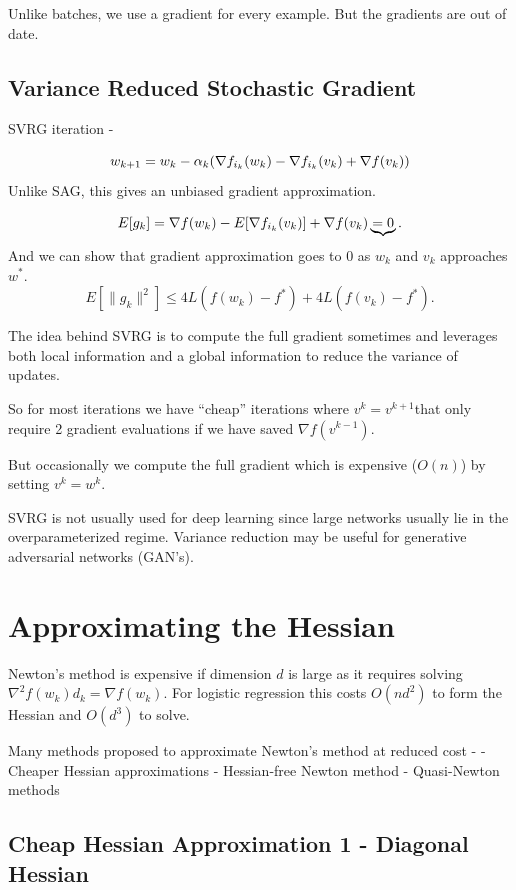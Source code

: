 \documentclass[
]{article}
\begin{document}
Unlike batches, we use a gradient for every example. But the gradients are out of date.

\subsection{Variance Reduced Stochastic Gradient}\label{variance-reduced-stochastic-gradient}

SVRG iteration -

\[
w_{k+1} = w_k - \alpha_k(\nabla f_{i_k}(w_k) - \nabla f_{i_k}(v_k) + \nabla f(v_k)) \\
\]
Unlike SAG, this gives an unbiased gradient approximation.

\[
E[g_k] = \nabla f(w_k) - E[\nabla f_{i_k}(v_k)] + \nabla f(v_k) \underbrace{= 0}. \\
\]
And we can show that gradient approximation goes to 0 as \(w_k\) and \(v_k\) approaches \(w^*\).
\[
E[\|g_k\|^2] \leq 4L(f(w_k) - f^*) + 4L(f(v_k) - f^*).
\]

The idea behind SVRG is to compute the full gradient sometimes and leverages both local information and a global information to reduce the variance of updates.

So for most iterations we have ``cheap'' iterations where \(v^k = v^{k+1}\)that only require 2 gradient evaluations if we have saved \(\nabla f (v^{k-1})\).

But occasionally we compute the full gradient which is expensive (\(O(n)\)) by setting \(v^k = w^k\).

SVRG is not usually used for deep learning since large networks usually lie in the overparameterized regime. Variance reduction may be useful for generative adversarial networks (GAN's).

\section{Approximating the Hessian}\label{approximating-the-hessian}

Newton's method is expensive if dimension \(d\) is large as it requires solving \(\nabla^2 f(w_k) d_k = \nabla f(w_k)\). For logistic regression this costs \(O(nd^2)\) to form the Hessian and \(O(d^3)\) to solve.

Many methods proposed to approximate Newton's method at reduced cost -
- Cheaper Hessian approximations
- Hessian-free Newton method
- Quasi-Newton methods

\subsection{Cheap Hessian Approximation 1 - Diagonal Hessian}\label{cheap-hessian-approximation-1---diagonal-hessian}
\end{document}
